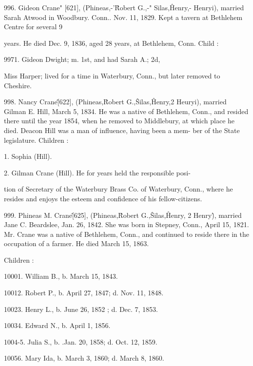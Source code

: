 \documentclass{book}
\begin{document}
996. Gideon Crane" [621], (Phineas,-'\^ Robert G.,-" Silas,\^ 
Henry,- Henryi), married Sarah Atwood in Woodbury. Conn.. 
Nov. 11, 1829. Kept a tavern at Bethlehem Centre for several 
9 




years. He died Dec. 9, 1836, aged 28 years, at Bethlehem, 
Conn. Child : 

9971. Gideon Dwight; m. 1st, and had Sarah A.; 2d, 

Miss Harper; lived for a time in Waterbury, Conn., but 
later removed to Cheshire. 

998. Nancy Crane\^ [622], (Phineas,\^ Robert G.,\^ Silas,\^ 
Henry,2 Heuryi), married Gilman E. Hill, March 5, 1834. He 
was a native of Bethlehem, Conn., and resided there until the 
year 1854, when he removed to Middlebury, at which place he 
died. Deacon Hill was a man of influence, having been a mem- 
ber of the State legislature. Children : 

1. Sophia (Hill). 

2. Gilman Crane (Hill). He for years held the responsible posi- 

tion of Secretary of the Waterbury Brass Co. of Waterbury, 
Conn., where he resides and enjoys the esteem and confidence 
of his fellow-citizens. 

999. Phineas M. Crane\^ [625], (Phineas,\^ Robert G.,\^ Silas,\^ 
Henry, 2 Henry\^), married Jane C. Beardslee, Jan. 26, 1842. 
She was born in Stepney, Conn., April 15, 1821. Mr. Crane 
was a native of Bethlehem, Conn., and continued to reside there 
in the occupation of a farmer. He died March 15, 1863. 

Children : 

10001. William B., b. March 15, 1843. 

10012. Robert P., b. April 27, 1847; d. Nov. 11, 1848. 

10023. Henry L., b. June 26, 1852 ; d. Dec. 7, 1853. 

10034. Edward N., b. April 1, 1856. 

1004-5. Julia S., b. .Jan. 20, 1858; d. Oct. 12, 1859. 

10056. Mary Ida, b. March 3, 1860; d. March 8, 1860. 
\end{document}
